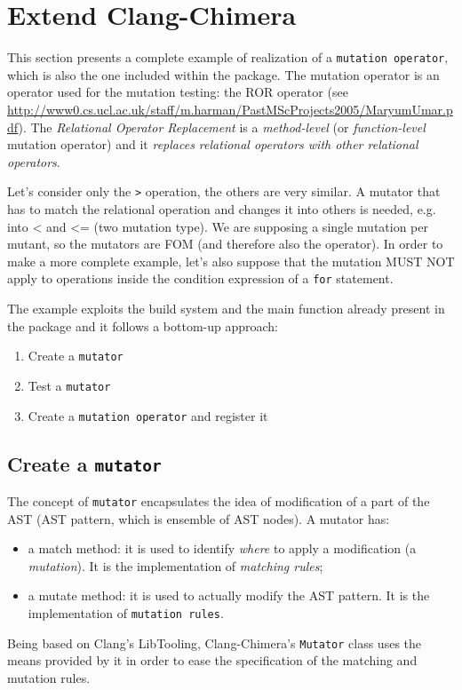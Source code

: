 \documentclass[10pt,a4paper]{article}
\begin{document}
\section{Extend Clang-Chimera}
\label{extend_clang_chimera}
This section presents a complete example of realization of a \texttt{mutation operator}, which is also the one included within the package.
The mutation operator is an operator used for the mutation testing: the ROR operator (see \url{http://www0.cs.ucl.ac.uk/staff/m.harman/PastMScProjects2005/MaryumUmar.pdf}). The \textit{Relational Operator Replacement} is a \textit{method-level} (or \textit{function-level} mutation operator) and it \textit{replaces relational operators with other relational operators}.

Let's consider only the \texttt{>} operation, the others are very similar. A mutator that has to match the relational operation and changes it into others is needed, e.g. into < and <= (two mutation type). We are supposing a single mutation per mutant, so the mutators are FOM (and therefore also the operator).
In order to make a more complete example, let's also suppose that the mutation MUST NOT apply to operations inside the condition expression of a \texttt{for} statement.

The example exploits the build system and the main function already present in the package and it follows a bottom-up approach:
\begin{enumerate}
\item Create a \texttt{mutator}
\item Test a \texttt{mutator}
\item Create a \texttt{mutation operator} and register it
\end{enumerate}

\subsection{Create a \texttt{mutator}}
The concept of \texttt{mutator} encapsulates the idea of modification of a part of the AST (AST pattern, which is ensemble of AST nodes). A mutator has:
\begin{itemize}
\item a match method: it is used to identify \textit{where} to apply a modification (a \textit{mutation}). It is the implementation of \textit{matching rules};
\item a mutate method: it is used to actually modify the AST pattern. It is the implementation of \texttt{mutation rules}.
\end{itemize}
Being based on Clang's LibTooling, Clang-Chimera's \texttt{Mutator} class uses the means provided by it in order to ease the specification of the matching and mutation rules.
\end{document}
